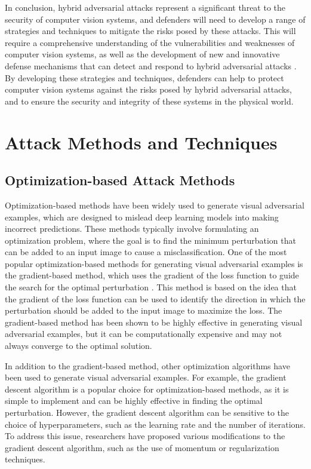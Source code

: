 \documentclass[11pt]{article}
\begin{document}
In conclusion, hybrid adversarial attacks represent a significant threat to the security of computer vision systems, and defenders will need to develop a range of strategies and techniques to mitigate the risks posed by these attacks. This will require a comprehensive understanding of the vulnerabilities and weaknesses of computer vision systems, as well as the development of new and innovative defense mechanisms that can detect and respond to hybrid adversarial attacks \cite{ref36}. By developing these strategies and techniques, defenders can help to protect computer vision systems against the risks posed by hybrid adversarial attacks, and to ensure the security and integrity of these systems in the physical world.

\section{Attack Methods and Techniques}

\subsection{Optimization-based Attack Methods}

Optimization-based methods have been widely used to generate visual adversarial examples, which are designed to mislead deep learning models into making incorrect predictions. These methods typically involve formulating an optimization problem, where the goal is to find the minimum perturbation that can be added to an input image to cause a misclassification. One of the most popular optimization-based methods for generating visual adversarial examples is the gradient-based method, which uses the gradient of the loss function to guide the search for the optimal perturbation \cite{ref57}. This method is based on the idea that the gradient of the loss function can be used to identify the direction in which the perturbation should be added to the input image to maximize the loss. The gradient-based method has been shown to be highly effective in generating visual adversarial examples, but it can be computationally expensive and may not always converge to the optimal solution.

In addition to the gradient-based method, other optimization algorithms have been used to generate visual adversarial examples. For example, the gradient descent algorithm \cite{ref58} is a popular choice for optimization-based methods, as it is simple to implement and can be highly effective in finding the optimal perturbation. However, the gradient descent algorithm can be sensitive to the choice of hyperparameters, such as the learning rate and the number of iterations. To address this issue, researchers have proposed various modifications to the gradient descent algorithm, such as the use of momentum or regularization techniques.
\end{document}
